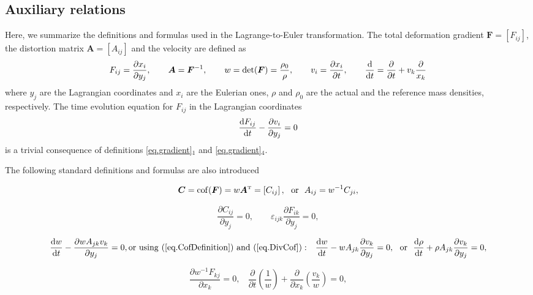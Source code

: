 \documentclass[twoside]{article}
\newcommand{\AAA}{{\boldsymbol{A}}}
\newcommand{\FF}{{\boldsymbol{F}}}
\newcommand{\pd}{\partial}
\newcommand{\rmd}{{\rm d}}
\newcommand{\transpose}{{\rm {\mathsmaller T}}}
\begin{document}
\subsection{Auxiliary relations}
Here, we summarize the definitions and formulas used in the Lagrange-to-Euler 
transformation. The total 
deformation gradient $\FF= [F_{ij}] $, the distortion matrix $ \AAA=[A_{ij}] $ 
and the velocity are defined as
\begin{equation}\label{eq.gradient}
F_{ij}=\dfrac{\pd x_i}{\pd y_j},\qquad \AAA=\FF^{-1},\qquad w=\det 
(\FF)=\dfrac{\rho_0}{\rho},\qquad v_i=\frac{\pd x_i}{ \pd t}, \qquad
\frac{\rm d}{{\rm d} t} = \frac{\pd}{\pd t} + v_k\dfrac{\pd}{x_k}
\end{equation}
where  $ y_j $ are the Lagrangian coordinates and $ x_i $ are 
the Eulerian ones, $ \rho $ and $ \rho_0 $ are the actual
and the reference mass densities, respectively. The time evolution equation for 
$ F_{ij} $ in the Lagrangian coordinates
\begin{equation}\label{eq.gradient.time}
\frac{\rmd F_{ij}}{\rmd t} - \frac{\pd v_i}{\pd y_j}=0
\end{equation}
is a trivial consequence of definitions \eqref{eq.gradient}$ _1 $ and 
\eqref{eq.gradient}$ _4 $.


The following standard definitions and formulas  are also introduced

\begin{equation}\label{eq.CofDefinition}
\boldsymbol{C}={\rm cof}(\FF)=w \AAA^\transpose=\left[C_{{ij}}\right], \text{ \ 
or \ }A_{{ij}}=w^{-1}C_{{ji}},
\end{equation}

\begin{equation}\label{eq.DivCof}
\frac{\pd C_{i j}}{\pd y_j}=0,\qquad \varepsilon 
_{{ijk}}\frac{\pd  F_{{ik}}}{\pd y_j}=0,
\end{equation}


\begin{equation}\label{eq.DetTimeEvol}
\frac{{\rm d} w}{{\rm d} t}-\frac{\pd w A_{j k}v_k}{\pd y_j}=0,{\rm 
or\ using\ (\ref{eq.CofDefinition})\ and\ (\ref{eq.DivCof}):\ \ \ }\frac{{\rm 
d} w}{{\rm d} t}-w A_{j k}\frac{\pd v_k}{\pd y_j}=0,\ \ {\rm or}\ \ 
\frac{{\rm 
d} \rho}{{\rm d} t} + \rho A_{j k}\frac{\pd v_k}{\pd y_j}=0,
\end{equation}

\begin{equation}\label{eqn.constF.euler}
\frac{\pd w^{-1}F_{kj}}{\pd x_k}=0,\ \ \ \ \frac{\pd }{\pd t}\left ( 
\frac{1}{w}\right ) + \frac{\pd }{\pd x_k}\left( 
\frac{v_k}{w}\right) =0,
\end{equation}
\end{document}
